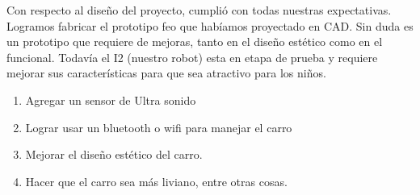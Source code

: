 \documentclass[11pt]{article}
\begin{document}
\vspace{1.5cm}
Con respecto al diseño del proyecto, cumplió con todas nuestras expectativas. Logramos fabricar el prototipo feo que habíamos proyectado en CAD. Sin duda es un prototipo que requiere de mejoras, tanto en el diseño estético como en el funcional. Todavía el I2 (nuestro robot) esta en etapa de prueba y requiere mejorar sus características para que sea atractivo para los niños.


\begin{enumerate}
\item Agregar un sensor de Ultra sonido
\item Lograr usar un bluetooth o wifi para manejar el carro
\item Mejorar el diseño estético del carro.
\item Hacer que el carro sea más liviano, entre otras cosas.

\end{enumerate}
\end{document}
